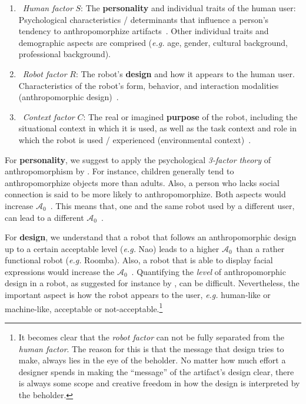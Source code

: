 \documentclass{frontiersSCNS} %
\newcommand{\eg}{\textit{e.g.}\xspace}
\newcommand{\ICA}{{$\mathcal{A}_0$~}}
\begin{document}
\begin{enumerate}

    \item ~\emph{Human factor} $S$: The \textbf{personality} and individual
        traits of the human user: Psychological characteristics / determinants
        that influence a person's tendency to anthropomorphize
        artifacts~\citep{epley_seeing_2007}. Other individual traits and
        demographic aspects are comprised (\eg age, gender, cultural background,
        professional background).

    \item ~\emph{Robot factor} $R$: The robot's \textbf{design} and how it
        appears to the human user. Characteristics of the robot's form,
        behavior, and interaction modalities (anthropomorphic
        design)~\citep{fong_survey_2003}.

    \item ~\emph{Context factor} $C$: The real or imagined
        \textbf{purpose} of the robot, including the situational context in
        which it is used, as well as the task context and role in which the
        robot is used / experienced (environmental
        context)~\citep{joosse_what_2013}.

\end{enumerate}	


For \textbf{personality}, we suggest to apply the psychological \textit{3-factor
theory} of anthropomorphism by \citet{epley_seeing_2007}. For instance, children
generally tend to anthropomorphize objects more than adults. Also, a person who
lacks social connection is said to be more likely to anthropomorphize. Both
aspects would increase \ICA. This means that, one and the same robot used by a
different user, can lead to a different \ICA.

For \textbf{design}, we understand that a robot that follows an anthropomorphic
design up to a certain acceptable level (\eg Nao) leads to a higher \ICA than a
rather functional robot (\eg Roomba). Also, a robot that is able to display
facial expressions would increase the \ICA. Quantifying the \emph{level} of
anthropomorphic design in a robot, as suggested for instance by
\citet{fong_survey_2003}, can be difficult.  Nevertheless, the important aspect
is how the robot appears to the user, \eg human-like or machine-like, acceptable
or not-acceptable.\footnote{It becomes clear that the \textit{robot factor} can
not be fully separated from the \textit{human factor}. The reason for this is
that the message that design tries to make, always lies in the eye of the
beholder. No matter how much effort a designer spends in making the ``message''
of the artifact's design clear, there is always some scope and creative freedom
in how the design is interpreted by the beholder.}
\end{document}
